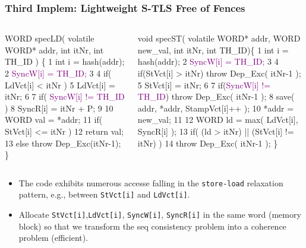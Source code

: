 \documentclass{beamer}
\newcommand{\purple}[1]{\textcolor{Purple}{{#1}}}
\newcommand{\emp}[1]{\textcolor{DikuRed}{ #1}}
\newcommand{\emphh}[1]{\textcolor{CosGreen}{ #1}}
\begin{document}
\begin{frame}[fragile,t]
  \frametitle{Third Implem: Lightweight S-TLS Free of Fences}

\begin{columns}
\begin{colorcode}
WORD specLD( volatile WORD* 
addr, int itNr, int TH_ID ) \{ 
1 int i = hash(addr); 
2 \purple{SyncW[i] = TH_ID;} 
3 
4 if( LdVct[i] < itNr )
5     LdVct[i] = itNr; 
6 
7 if( \purple{SyncW[i] != TH_ID} ) 
8   \emp{SyncR[i] = itNr + P;} 
9 
10 WORD val = *addr; 
11 if( StVct[i] <= itNr ) 
12      return val;
13 else throw Dep_Exc(itNr-1);
\} 
\end{colorcode}
\begin{colorcode}
void specST( volatile WORD* addr,
            WORD new_val, int itNr, int TH_ID)\{
1  int i = hash(addr);
2  \purple{SyncW[i] = TH_ID;}
3
4  if(StVct[i] > itNr) throw Dep_Exc( itNr-1 );
5  StVct[i] = itNr;
6
7  if(\purple{SyncW[i] != TH_ID}) \alert{throw Dep_Exc( itNr-1 );}
8  save( addr, *addr, StampVct[i]++ );
10 *addr = new_val;
11
12 WORD ld = \emp{max( LdVct[i], \emp{SyncR[i]} );}
13 if( (\alert{ld > itNr}) || (StVct[i] != itNr) )
14 throw Dep_Exc( itNr-1 ); 
\}
\end{colorcode}
\end{columns}
\medskip\pause

        \begin{itemize}
            \item The code exhibits numerous accesse falling in the
                    {\tt store-load} relaxation pattern,  e.g., 
                    between {\tt StVct[i]} and {\tt LdVct[i]}.\pause
            \item \emphh{Allocate {\tt StVct[i]},{\tt LdVct[i]}, {\tt SyncW[i]},
                    {\tt SyncR[i]} in the same word (memory block) so
                    that we transform the seq consistency problem into a 
                    coherence problem (efficient).}
        \end{itemize}
\end{frame}
\end{document}
